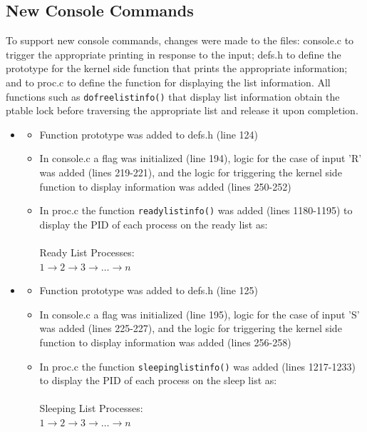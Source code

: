 \documentclass[11pt,letterpaper]{report}
\begin{document}
	\newpage
		
	\subsection*{New Console Commands}
	To support new console commands, changes were made to the files: console.c to trigger the appropriate printing in response to the  input; defs.h to define the prototype for the kernel side function that prints the appropriate information; 
	and to proc.c to define the function for displaying the list information. All functions such as {\tt dofreelistinfo()} that display list information obtain the ptable lock before traversing the appropriate list and release it upon completion.
		\begin{itemize}
			\item {} 
				\begin{itemize}
					\item Function prototype was added to defs.h (line 124)
					\item In console.c a flag was initialized (line 194), logic for the case of input 'R' was added (lines 219-221), and the logic for triggering the kernel side function to display information was added (lines 250-252)
					\item In proc.c the function {\tt readylistinfo()} was added (lines 1180-1195) to display the PID of each process on the ready list as: \\
						\\ Ready List Processes: \\ $1 \rightarrow 2 \rightarrow 3 \rightarrow \ldots \rightarrow n$
				\end{itemize}
				
			\item {} 
				\begin{itemize}
					\item Function prototype was added to defs.h (line 125)
					\item In console.c a flag was initialized (line 195), logic for the case of input 'S' was added (lines 225-227), and the logic for triggering the kernel side function to display information was added (lines 256-258)
					\item In proc.c the function {\tt sleepinglistinfo()} was added (lines 1217-1233) to display the PID of each process on the sleep list as: \\
						\\ Sleeping List Processes: \\ $1 \rightarrow 2 \rightarrow 3 \rightarrow \ldots \rightarrow n$
				\end{itemize}
			

\end{itemize}
\end{document}
